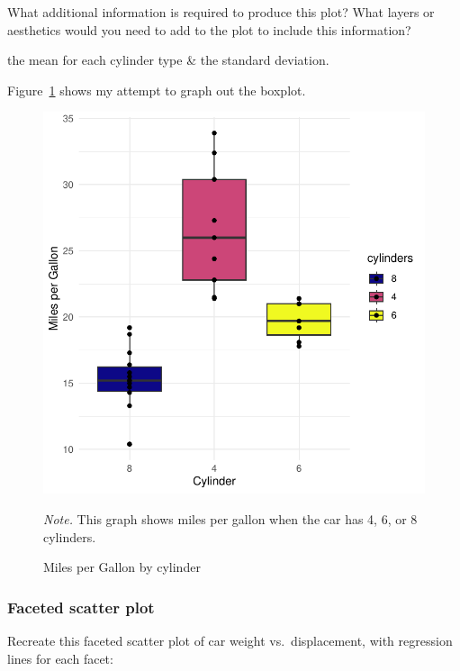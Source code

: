 \documentclass[
  man,
  floatsintext,
  longtable,
  nolmodern,
  notxfonts,
  notimes,
  colorlinks=true,linkcolor=blue,citecolor=blue,urlcolor=blue]{apa7}
\begin{document}
What additional information is required to produce this plot? What
layers or aesthetics would you need to add to the plot to include this
information?

the mean for each cylinder type \& the standard deviation.

Figure~\ref{fig-plot4-boxplot} shows my attempt to graph out the
boxplot.

\begin{figure}[!htbp]

{\caption{{Miles per Gallon by cylinder}{\label{fig-plot4-boxplot}}}}

\includegraphics{data-visualization_files/figure-pdf/fig-plot4-boxplot-1.pdf}

{\noindent \emph{Note.} This graph shows miles per gallon when the car
has 4, 6, or 8 cylinders.}

\end{figure}

\subsubsection{Faceted scatter plot}\label{faceted-scatter-plot}

Recreate this faceted scatter plot of car weight vs.~displacement, with
regression lines for each facet:
\end{document}
